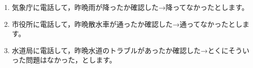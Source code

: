 \begin{enumerate}
	\item 気象庁に電話して，昨晩雨が降ったか確認した→降ってなかったとします。
	\item 市役所に電話して，昨晩散水車が通ったか確認した→通ってなかったとします。
	\item 水道局に電話して，昨晩水道のトラブルがあったか確認した→とくにそういった問題はなかった，とします。
\end{enumerate}

